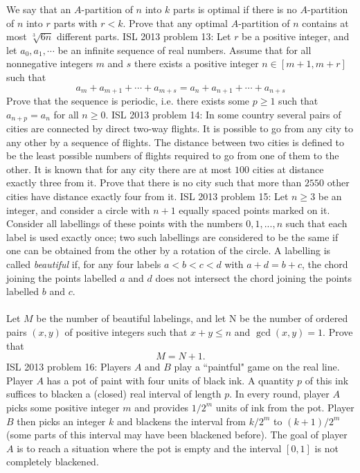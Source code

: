 We say that an $A$-partition of $n$ into $k$ parts is optimal if there is no $A$-partition of $n$ into $r$ parts with $r<k$. Prove that any optimal $A$-partition of $n$ contains at most $\sqrt[3]{6n}$ different parts. 
ISL 2013 problem 13:  Let $r$ be a positive integer, and let $a_0 , a_1 , \cdots $ be an infinite sequence of real numbers. Assume that for all nonnegative integers $m$ and $s$ there exists a positive integer $n \in [m+1, m+r]$ such that
\[ a_m + a_{m+1} +\cdots +a_{m+s} = a_n + a_{n+1} +\cdots +a_{n+s} \]
Prove that the sequence is periodic, i.e. there exists some $p \ge 1 $ such that $a_{n+p} =a_n $ for all $n \ge 0$. 
ISL 2013 problem 14:  In some country several pairs of cities are connected by direct two-way flights. It is possible to go from any city to any other by a sequence of flights. The distance between two cities is defined to be the least possible numbers of flights required to go from one of them to the other. It is known that for any city there are at most $100$ cities at distance exactly three from it. Prove that  there is no city such that more than $2550$ other cities have distance exactly four from it. 
ISL 2013 problem 15:  Let $n \ge 3$ be an integer, and consider a circle with $n + 1$ equally spaced points marked on it. Consider all labellings of these points with the numbers $0, 1, ... , n$ such that each label is used exactly once; two such labellings are considered to be the same if one can be obtained from the other by a rotation of the circle. A labelling is called \textit{beautiful} if, for any four labels $a < b < c < d$ with $a + d = b + c$, the chord joining the points labelled $a$ and $d$ does not intersect the chord joining the points labelled $b$ and $c$. \\\\
Let $M$ be the number of beautiful labelings, and let N be the number of ordered pairs $(x, y)$ of positive integers such that $x + y \le n$ and $\gcd(x, y) = 1$. Prove that
\[ M = N + 1. \] 
ISL 2013 problem 16:  Players $A$ and $B$ play a ``paintful" game on the real line. Player $A$ has a pot of paint with four units of black ink. A quantity $p$ of this ink suffices to blacken a (closed) real interval of length $p$. In every round, player $A$ picks some positive integer $m$ and provides $1/2^m $ units of ink from the pot. Player $B$ then picks an integer $k$ and blackens the interval from $k/2^m$ to $(k+1)/2^m$ (some parts of this interval may have been blackened before). The goal of player $A$ is to reach a situation where the pot is empty and the interval $[0,1]$ is not completely blackened. \\
